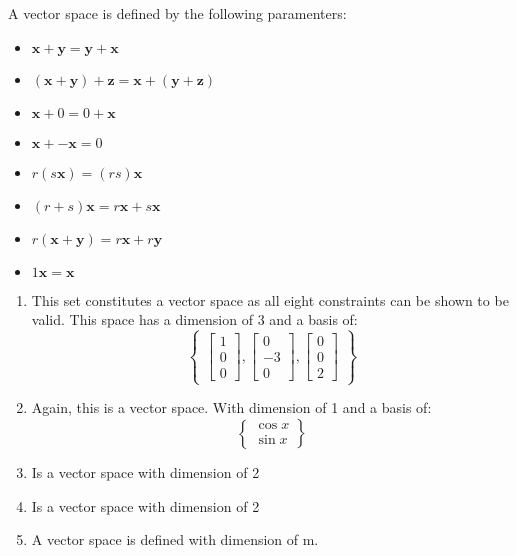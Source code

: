 	A vector space is defined by the following paramenters:
		\begin{itemize}
			\item $\boldsymbol{x}+\boldsymbol{y}=\boldsymbol{y}+\boldsymbol{x}$
			\item $\left(\boldsymbol{x}+\boldsymbol{y}\right)+\boldsymbol{z}=\boldsymbol{x}+\left(\boldsymbol{y}+\boldsymbol{z}\right)$
			\item $\boldsymbol{x}+0=0+\boldsymbol{x}$
			\item $\boldsymbol{x}+ -\boldsymbol{x}=0$
			\item $r\left(s\boldsymbol{x}\right)=\left(rs\right)\boldsymbol{x}$
			\item $\left(r+s\right)\boldsymbol{x}=r\boldsymbol{x}+s\boldsymbol{x}$
			\item $r\left(\boldsymbol{x}+\boldsymbol{y}\right)=r\boldsymbol{x}+r\boldsymbol{y}$
			\item $1\boldsymbol{x}=\boldsymbol{x}$
			\end{itemize}
\begin{enumerate}
	\item This set constitutes a vector space as all eight constraints can be shown to be valid. This space has a dimension of 3 and a basis of:
	\begin{equation*}
		\begin{Bmatrix}
			\begin{bmatrix}
				1\\0\\0
			\end{bmatrix},
			\begin{bmatrix}
				0\\-3\\0
			\end{bmatrix},
			\begin{bmatrix}
				0\\0\\2
			\end{bmatrix}
		\end{Bmatrix}
	\end{equation*}
	\item Again, this is a vector space. With dimension of 1 and a basis of:
	\begin{equation*}
		\begin{Bmatrix}
			\cos x\\\sin x
		\end{Bmatrix}
	\end{equation*}
	\item Is a vector space with dimension of 2
	\item Is a vector space with dimension of 2
	\item A vector space is defined with dimension of m. 
\end{enumerate}